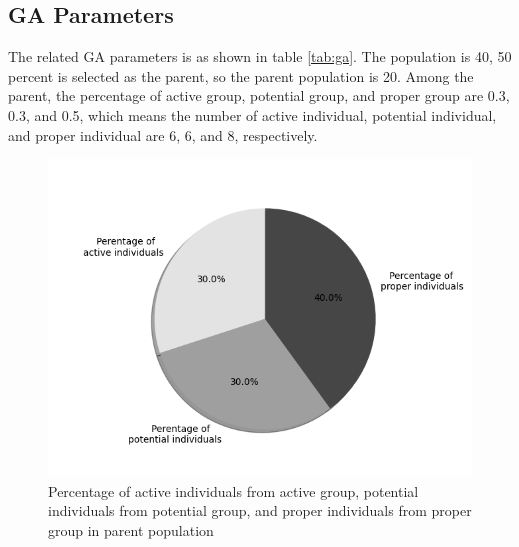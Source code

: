 \subsection{GA Parameters}
The related GA parameters is as shown in table \ref{tab:ga}. The population is
40, 50 percent is selected as the parent, so the parent population is 20.
Among the parent, the percentage of active group, potential group, and proper
group are 0.3, 0.3, and 0.5, which means the number of active individual,
potential individual, and proper individual are 6, 6, and 8, respectively.

\begin{figure}[!htb]
	\centering
	\includegraphics[width=\linewidth]{fig/percentage_of_groups}
	\caption{Percentage of active individuals from active group, potential
	  individuals from potential group, and proper individuals from proper group
	 in parent population}
	\label{fig:group}
\end{figure}



